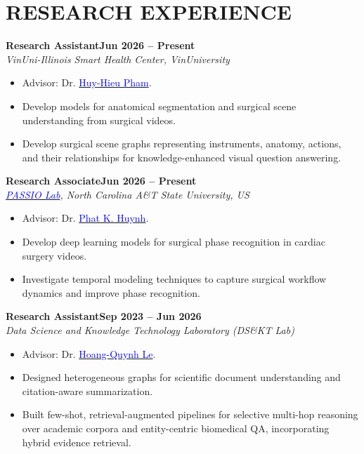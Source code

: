 \documentclass[11pt,a4paper]{article}
\newcommand{\heading}[2]{
  \noindent#1\hfill{\color{cvtextgray}#2}\\
}
\newcommand{\headingBf}[2]{
  \heading{\textbf{#1}}{\textbf{#2}}
}
\newcommand{\headingIt}[2]{
  \heading{\textit{#1}}{\textit{#2}}
}
\begin{document}

\section{RESEARCH EXPERIENCE}
\headingBf{Research Assistant}{Jun 2026 -- Present}
\headingIt{VinUni-Illinois Smart Health Center, VinUniversity}{}
\begin{itemize}
    \item Advisor: Dr. \href{https://huyhieupham.github.io/}{\textcolor{blue}{Huy-Hieu Pham}}.
    \item Develop models for anatomical segmentation and surgical scene understanding from surgical videos.
    \item Develop surgical scene graphs representing instruments, anatomy, actions, and their relationships for knowledge-enhanced visual question answering.
\end{itemize}

\headingBf{Research Associate}{Jun 2026 -- Present}
\headingIt{\href{https://www.passiolab.com/}{\textcolor{blue}{PASSIO Lab}}, North Carolina A\&T State University, US}{}
\begin{itemize}
    \item Advisor: Dr. \href{https://scholar.google.com/citations?user=Wo5c6BEAAAAJ&hl=vi}{\textcolor{blue}{Phat K. Huynh}}.
    \item Develop deep learning models for surgical phase recognition in cardiac surgery videos.
    \item Investigate temporal modeling techniques to capture surgical workflow dynamics and improve phase recognition.
\end{itemize}



\headingBf{Research Assistant}{Sep 2023 -- Jun 2026}
\headingIt{Data Science and Knowledge Technology Laboratory (DS\&KT Lab)}{}

\begin{itemize}
    \item Advisor: Dr. \href{https://scholar.google.com/citations?user=LBYOZ00AAAAJ&hl=vi}{\textcolor{blue}{Hoang-Quynh Le}}.
    \item Designed heterogeneous graphs for scientific document understanding and citation-aware summarization.
    \item Built few-shot, retrieval-augmented pipelines for selective multi-hop reasoning over academic corpora and entity-centric biomedical QA, incorporating hybrid evidence retrieval.
\end{itemize}
\end{document}
